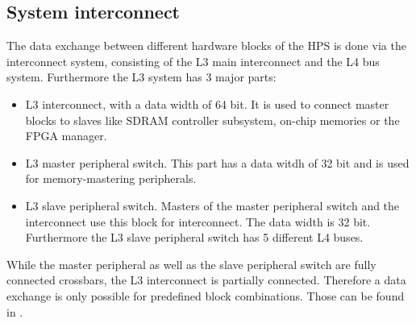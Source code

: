 \subsection{System interconnect}
The data exchange between different hardware blocks of the HPS is done via the interconnect system, consisting of the L3 main interconnect and the L4 bus system. Furthermore the L3 system has 3 major parts:
\begin{itemize}
\item L3 interconnect, with a data width of 64 bit. It is used to connect master blocks to slaves like SDRAM controller subsystem, on-chip memories or the FPGA manager.
\item L3 master peripheral switch. This part has a data witdh of 32 bit and is used for memory-mastering peripherals.
\item L3 slave peripheral switch. Masters of the master peripheral switch and the interconnect use this block for interconnect. The data width is 32 bit. Furthermore the L3 slave peripheral switch has 5 different L4 buses.
\end{itemize}
While the master peripheral as well as the slave peripheral switch are fully connected crossbars, the L3 interconnect is partially connected. Therefore a data exchange is only possible for predefined block combinations. Those can be found in \cite[chapter 7]{AlteraHPS15}.
